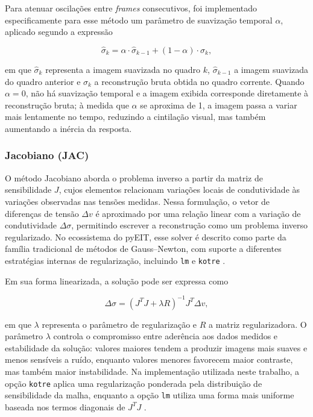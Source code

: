 Para atenuar oscilações entre \textit{frames} consecutivos, foi implementado especificamente para esse método um parâmetro de suavização temporal \(\alpha\), aplicado segundo a expressão

\begin{equation}
\label{eq:suavizacao_temporal}
\hat{\sigma}_k = \alpha \cdot \hat{\sigma}_{k-1} + (1 - \alpha)\cdot \sigma_k ,
\end{equation}

em que \(\hat{\sigma}_k\) representa a imagem suavizada no quadro \(k\), \(\hat{\sigma}_{k-1}\) a imagem suavizada do quadro anterior e \(\sigma_k\) a reconstrução bruta obtida no quadro corrente. Quando \(\alpha = 0\), não há suavização temporal e a imagem exibida corresponde diretamente à reconstrução bruta; à medida que \(\alpha\) se aproxima de 1, a imagem passa a variar mais lentamente no tempo, reduzindo a cintilação visual, mas também aumentando a inércia da resposta.

\subsubsection{Jacobiano (JAC)}
\label{subsubsec:jac}

O método Jacobiano aborda o problema inverso a partir da matriz de sensibilidade \(J\), cujos elementos relacionam variações locais de condutividade às variações observadas nas tensões medidas. Nessa formulação, o vetor de diferenças de tensão \(\Delta v\) é aproximado por uma relação linear com a variação de condutividade \(\Delta \sigma\), permitindo escrever a reconstrução como um problema inverso regularizado. No ecossistema do pyEIT, esse solver é descrito como parte da família tradicional de métodos de Gauss--Newton, com suporte a diferentes estratégias internas de regularização, incluindo \texttt{lm} e \texttt{kotre} \cite{pyEITReadme}.

Em sua forma linearizada, a solução pode ser expressa como

\begin{equation}
\Delta \sigma = (J^T J + \lambda R)^{-1} J^T \Delta v ,
\end{equation}

em que \(\lambda\) representa o parâmetro de regularização e \(R\) a matriz regularizadora. O parâmetro \(\lambda\) controla o compromisso entre aderência aos dados medidos e estabilidade da solução: valores maiores tendem a produzir imagens mais suaves e menos sensíveis a ruído, enquanto valores menores favorecem maior contraste, mas também maior instabilidade. Na implementação utilizada neste trabalho, a opção \texttt{kotre} aplica uma regularização ponderada pela distribuição de sensibilidade da malha, enquanto a opção \texttt{lm} utiliza uma forma mais uniforme baseada nos termos diagonais de \(J^T J\) \cite{pyEITReadme}.

